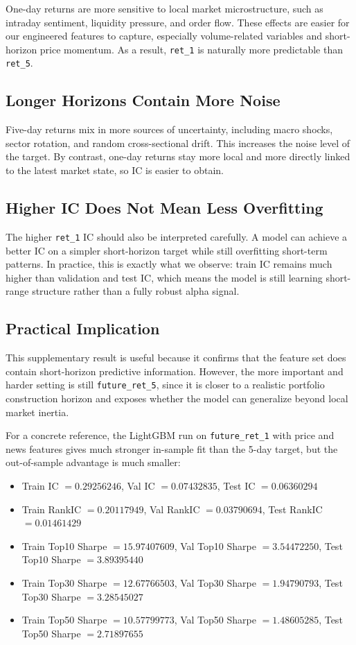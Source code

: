 One-day returns are more sensitive to local market microstructure, such as intraday sentiment, liquidity pressure, and order flow. These effects are easier for our engineered features to capture, especially volume-related variables and short-horizon price momentum. As a result, \texttt{ret\_1} is naturally more predictable than \texttt{ret\_5}.

\subsection{Longer Horizons Contain More Noise}

Five-day returns mix in more sources of uncertainty, including macro shocks, sector rotation, and random cross-sectional drift. This increases the noise level of the target. By contrast, one-day returns stay more local and more directly linked to the latest market state, so IC is easier to obtain.

\subsection{Higher IC Does Not Mean Less Overfitting}

The higher \texttt{ret\_1} IC should also be interpreted carefully. A model can achieve a better IC on a simpler short-horizon target while still overfitting short-term patterns. In practice, this is exactly what we observe: train IC remains much higher than validation and test IC, which means the model is still learning short-range structure rather than a fully robust alpha signal.

\subsection{Practical Implication}

This supplementary result is useful because it confirms that the feature set does contain short-horizon predictive information. However, the more important and harder setting is still \texttt{future\_ret\_5}, since it is closer to a realistic portfolio construction horizon and exposes whether the model can generalize beyond local market inertia.

For a concrete reference, the LightGBM run on \texttt{future\_ret\_1} with price and news features gives much stronger in-sample fit than the 5-day target, but the out-of-sample advantage is much smaller:
\begin{itemize}
\item Train IC $=0.29256246$, Val IC $=0.07432835$, Test IC $=0.06360294$
\item Train RankIC $=0.20117949$, Val RankIC $=0.03790694$, Test RankIC $=0.01461429$
\item Train Top10 Sharpe $=15.97407609$, Val Top10 Sharpe $=3.54472250$, Test Top10 Sharpe $=3.89395440$
\item Train Top30 Sharpe $=12.67766503$, Val Top30 Sharpe $=1.94790793$, Test Top30 Sharpe $=3.28545027$
\item Train Top50 Sharpe $=10.57799773$, Val Top50 Sharpe $=1.48605285$, Test Top50 Sharpe $=2.71897655$
\end{itemize}


